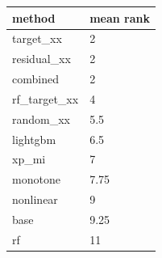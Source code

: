 \begin{tabular}{ll}
\toprule
method & mean rank \\
\midrule
target\_xx & 2 \\
residual\_xx & 2 \\
combined & 2 \\
rf\_target\_xx & 4 \\
random\_xx & 5.5 \\
lightgbm & 6.5 \\
xp\_mi & 7 \\
monotone & 7.75 \\
nonlinear & 9 \\
base & 9.25 \\
rf & 11 \\
\bottomrule
\end{tabular}
